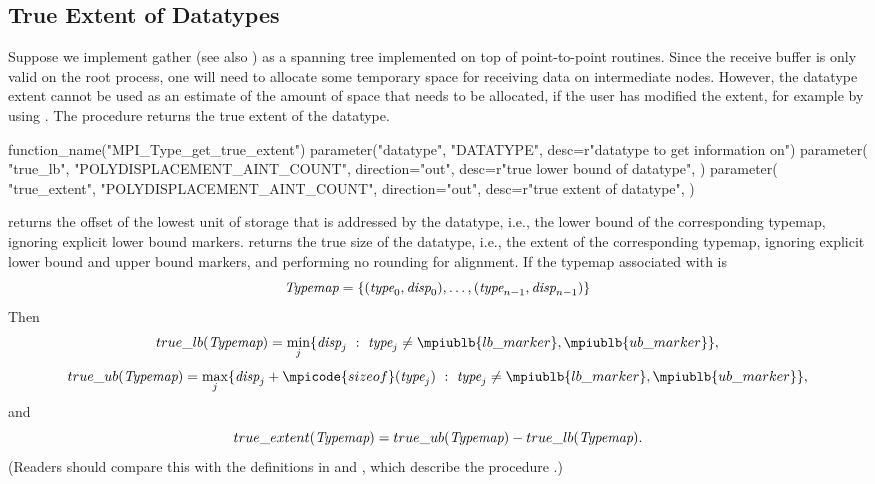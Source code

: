 \subsection{True Extent of Datatypes}
\label{subsec:pt2pt-true-extent}

Suppose we implement gather
(see also )
as a spanning tree implemented on top of
point-to-point routines.  Since the receive buffer is only valid on the
root process, one will need to allocate some temporary space for
receiving data on intermediate nodes.  However, the datatype extent
cannot be used as an estimate of the amount of space that needs to be
allocated, if the user has modified the extent, for example by
using .
The procedure  returns
the true extent of the datatype.

%
\begin{mpi-binding}
    function_name("MPI_Type_get_true_extent")
    parameter("datatype", "DATATYPE", desc=r"datatype to get information on")
    parameter(
        "true_lb",
        "POLYDISPLACEMENT_AINT_COUNT",
        direction="out",
        desc=r"true lower bound of datatype",
    )
    parameter(
        "true_extent",
        "POLYDISPLACEMENT_AINT_COUNT",
        direction="out",
        desc=r"true extent of datatype",
    )
\end{mpi-binding}

 returns the offset of the lowest unit of storage that
is addressed by the datatype, i.e., the lower bound of the
corresponding typemap, ignoring explicit lower bound markers.
 returns the
true size of
the datatype, i.e., the extent of the corresponding typemap, ignoring
explicit lower bound and upper bound markers, and performing no
rounding for alignment.  If the typemap associated with
 is
\[
\textrm{\itshape{Typemap}} = \{ (\textrm{\itshape{type}}_0, \textrm{\itshape{disp}}_0), \ldots , (\textrm{\itshape{type}}_{n-1}, \textrm{\itshape{disp}}_{n-1})\}
\]
Then
\[
true\_lb(\mword{Typemap}) = \min_j  \{ \mword{disp}_j ~:~ \mword{type}_j \ne \mpiublb{lb\_marker}, \mpiublb{ub\_marker} \},
\]
\[
true\_ub (\mword{Typemap}) = \max_j \{\mword{disp}_j + \mpicode{sizeof}(\mword{type}_j) ~:~ \mword{type}_j \ne
\mpiublb{lb\_marker}, \mpiublb{ub\_marker}\} ,
\]
and
\[
true\_extent (\textrm{\itshape{Typemap}}) = true\_ub(\textrm{\itshape{Typemap}}) - true\_lb(\textrm{\itshape{Typemap}}).
\]
(Readers should compare this with the definitions in
 and
,
which describe the procedure
.)

